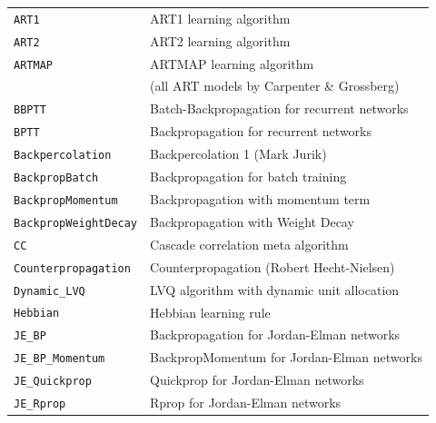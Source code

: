 {\newpage
\clearpage
\samepage \begin{tabular}{|l|l|}
\hline
{\tt ART1}              & ART1 learning algorithm \\ 
{\tt ART2}              & ART2 learning algorithm \\ 
{\tt ARTMAP}            & ARTMAP learning algorithm\\ 
                        & (all ART models by Carpenter \& Grossberg)\\ 
{\tt BBPTT}             & Batch-Backpropagation for recurrent networks~~\\ 
{\tt BPTT}              & Backpropagation for recurrent networks\\ 
{\tt Backpercolation}   & Backpercolation 1 (Mark Jurik)\\ 
{\tt BackpropBatch}     & Backpropagation for batch training\\ 
{\tt BackpropMomentum}  & Backpropagation with momentum term\\ 
{\tt BackpropWeightDecay} & Backpropagation with Weight Decay \\ 
{\tt CC}                & Cascade correlation meta algorithm\\ 
{\tt Counterpropagation}& Counterpropagation (Robert Hecht-Nielsen)\\ 
{\tt Dynamic\_LVQ}      & LVQ algorithm with dynamic unit allocation\\ 
{\tt Hebbian}           & Hebbian learning rule\\ 
{\tt JE\_BP}            & Backpropagation for Jordan-Elman networks\\ 
{\tt JE\_BP\_Momentum}  & BackpropMomentum for Jordan-Elman networks\\ 
{\tt JE\_Quickprop}     & Quickprop for Jordan-Elman networks\\ 
{\tt JE\_Rprop}         & Rprop for Jordan-Elman networks\\ 
\hline 
\end{tabular}
}

